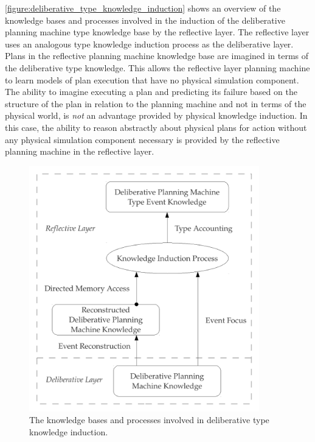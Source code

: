 {\mbox{\autoref{figure:deliberative_type_knowledge_induction}}} shows
an overview of the knowledge bases and processes involved in the
induction of the deliberative planning machine type knowledge base by
the reflective layer.  The reflective layer uses an analogous type
knowledge induction process as the deliberative layer.  Plans in the
reflective planning machine knowledge base are imagined in terms of
the deliberative type knowledge.  This allows the reflective layer
planning machine to learn models of plan execution that have no
physical simulation component.  The ability to imagine executing a
plan and predicting its failure based on the structure of the plan in
relation to the planning machine and not in terms of the physical
world, is \emph{not} an advantage provided by physical knowledge
induction.  In this case, the ability to reason abstractly about
physical plans for action without any physical simulation component
necessary is provided by the reflective planning machine in the
reflective layer.
\begin{figure}[h]
\centering
\includegraphics[width=10cm]{gfx/deliberative_type_knowledge_induction}
\caption[The knowledge bases and processes involved in deliberative
  type knowledge induction.]{The knowledge bases and processes
  involved in deliberative type knowledge induction.}
\label{figure:deliberative_type_knowledge_induction}
\end{figure}

